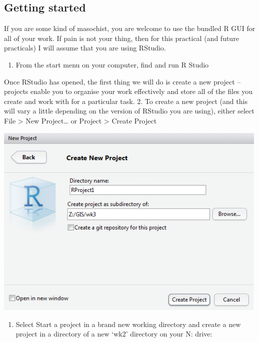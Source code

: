\documentclass[]{book}
\providecommand{\tightlist}{%
  \setlength{\itemsep}{0pt}\setlength{\parskip}{0pt}}
\begin{document}
\hypertarget{getting-started-1}{%
\subsection{Getting started}\label{getting-started-1}}

If you are some kind of masochist, you are welcome to use the bundled R GUI for all of your work. If pain is not your thing, then for this practical (and future practicals) I will assume that you are using RStudio.

\begin{enumerate}
\def\labelenumi{\arabic{enumi}.}
\tightlist
\item
  From the start menu on your computer, find and run R Studio
\end{enumerate}

Once RStudio has opened, the first thing we will do is create a new project -- projects enable you to organise your work effectively and store all of the files you create and work with for a particular task.
2. To create a new project (and this will vary a little depending on the version of RStudio you are using), either select File \textgreater{} New Project\ldots{} or Project \textgreater{} Create Project

\begin{center}\includegraphics[width=500px]{prac2_images/r_newproject} \end{center}

\begin{enumerate}
\def\labelenumi{\arabic{enumi}.}
\setcounter{enumi}{2}
\tightlist
\item
  Select Start a project in a brand new working directory and create a new project in a directory of a new `wk2' directory on your N: drive:
\end{enumerate}
\end{document}
